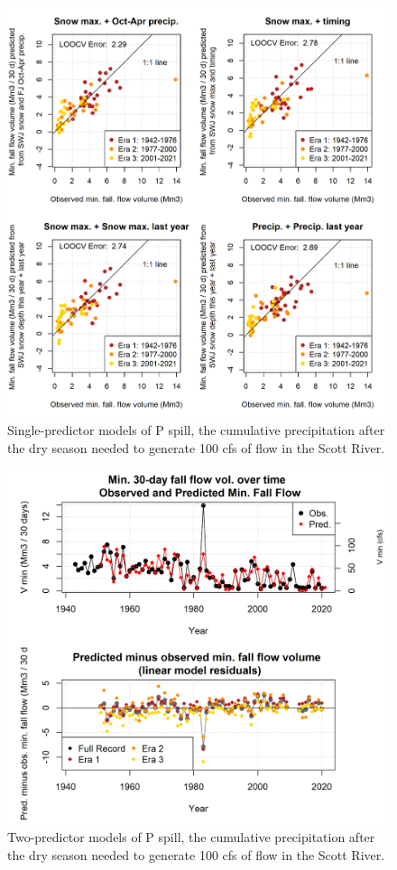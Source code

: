 \documentclass[hess, manuscript]{copernicus}
\begin{document}
\begin{figure}
\includegraphics[width=1\linewidth]{f12} \caption{\label{fig:one_predictor_model_p_spill} Single-predictor models of P spill, the cumulative precipitation after the dry season needed to generate 100 cfs of flow in the Scott River.}\label{fig:one_predictor_model_p_spill}
\end{figure}

\begin{figure}
\includegraphics[width=1\linewidth]{f13} \caption{\label{fig:two_predictor_model_p_spill} Two-predictor models of P spill, the cumulative precipitation after the dry season needed to generate 100 cfs of flow in the Scott River.}\label{fig:two_predictor_model_p_spill}
\end{figure}
\end{document}
